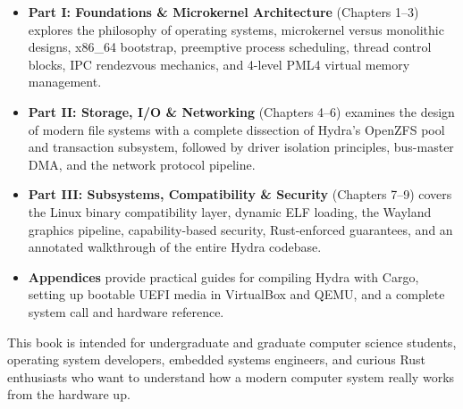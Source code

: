 \begin{itemize}
    \item \textbf{Part I: Foundations \& Microkernel Architecture} (Chapters 1--3) explores the philosophy of operating systems, microkernel versus monolithic designs, x86\_64 bootstrap, preemptive process scheduling, thread control blocks, IPC rendezvous mechanics, and 4-level PML4 virtual memory management.
    \item \textbf{Part II: Storage, I/O \& Networking} (Chapters 4--6) examines the design of modern file systems with a complete dissection of Hydra's OpenZFS pool and transaction subsystem, followed by driver isolation principles, bus-master DMA, and the network protocol pipeline.
    \item \textbf{Part III: Subsystems, Compatibility \& Security} (Chapters 7--9) covers the Linux binary compatibility layer, dynamic ELF loading, the Wayland graphics pipeline, capability-based security, Rust-enforced guarantees, and an annotated walkthrough of the entire Hydra codebase.
    \item \textbf{Appendices} provide practical guides for compiling Hydra with Cargo, setting up bootable UEFI media in VirtualBox and QEMU, and a complete system call and hardware reference.
\end{itemize}

This book is intended for undergraduate and graduate computer science students, operating system developers, embedded systems engineers, and curious Rust enthusiasts who want to understand how a modern computer system really works from the hardware up.


